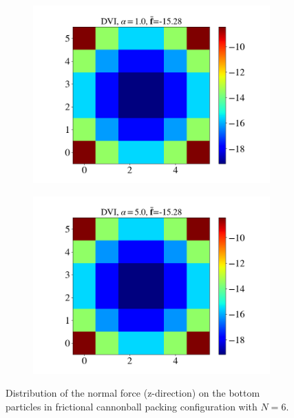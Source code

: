 \begin{itemize}
\begin{figure}[H]
\begin{subfigure}{0.32\columnwidth}
			\includegraphics[width=1.0\textwidth]{images/CD/Example7/5/N_6_DVI_1.0.png}
		\end{subfigure}
		\begin{subfigure}{0.32\columnwidth}	
			\centering
			\includegraphics[width=1.0\textwidth]{images/CD/Example7/5/N_6_DVI_5.0.png}
		\end{subfigure}
		\caption{Distribution of the normal force (z-direction) on the bottom particles in frictional cannonball packing configuration with $N=6$.}\label{fig:cbp_fp_N=6}
	\end{figure}
	\begin{figure}[H]
		\centering	
		\begin{subfigure}{0.32\columnwidth}	

\end{subfigure}
\end{figure}
\end{itemize}

